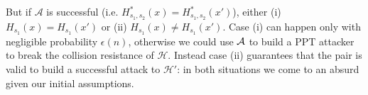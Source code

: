 \begin{enumerate}[(a)]
\begin{solution}
	But if $\mathcal{A}$ is successful (i.e. $H^*_{s_1, s_2}(x) = H^*_{s_1, s_2}(x')$), either (i) $H_{s_1}(x) = H_{s_1}(x')$ or (ii) $H_{s_1}(x) \ne H_{s_1}(x')$. Case (i) can happen only with negligible probability $\epsilon(n)$, otherwise we could use $\mathcal{A}$ to build a PPT attacker to break the collision resistance of $\mathcal{H}$. Instead case (ii) guarantees that the pair is valid to build a successful attack to $\mathcal{H}'$: in both situations we come to an absurd given our initial assumptions.
	\end{solution}
\end{enumerate}